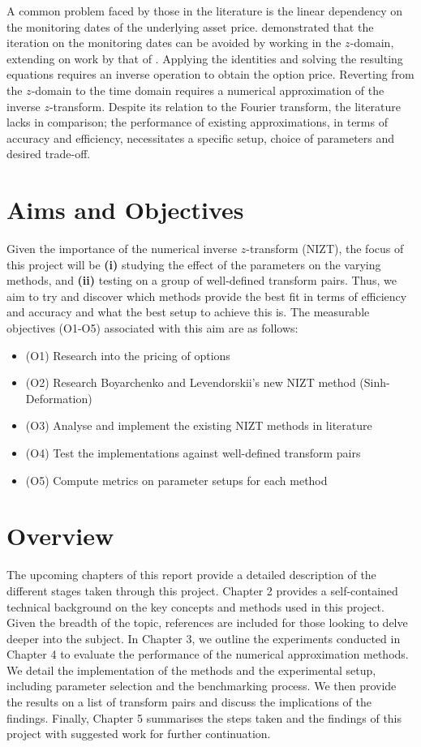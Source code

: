 \documentclass[a4paper]{report}
\begin{document}
A common problem faced by those in the literature is the linear dependency on the monitoring dates of the underlying asset price. \citet{fusai2016spitzer} demonstrated that the iteration on the monitoring dates can be avoided by working in the $z$-domain, extending on work by that of \citet{carr1999option}. Applying the \citet{spitzer1957wiener} identities and solving the resulting equations requires an inverse operation to obtain the option price. Reverting from the $z$-domain to the time domain requires a numerical approximation of the inverse $z$-transform. Despite its relation to the Fourier transform, the literature lacks in comparison; the performance of existing approximations, in terms of accuracy and efficiency, necessitates a specific setup, choice of parameters and desired trade-off.

\section{Aims and Objectives}
Given the importance of the numerical inverse $z$-transform (NIZT), the focus of this project will be \textbf{(i)} studying the effect of the parameters on the varying methods, and \textbf{(ii)} testing on a group of well-defined transform pairs. Thus, we aim to try and discover which methods provide the best fit in terms of efficiency and accuracy and what the best setup to achieve this is. The measurable objectives (O1-O5) associated with this aim are as follows:

\begin{itemize}
	\item (O1) Research into the pricing of options
	\item (O2) Research Boyarchenko and Levendorskii's new NIZT method (Sinh-Deformation)
	\item (O3) Analyse and implement the existing NIZT methods in literature
	\item (O4) Test the implementations against well-defined transform pairs
	\item (O5) Compute metrics on parameter setups for each method
\end{itemize}

\section{Overview}
The upcoming chapters of this report provide a detailed description of the different stages taken through this project. Chapter 2 provides a self-contained technical background on the key concepts and methods used in this project. Given the breadth of the topic, references are included for those looking to delve deeper into the subject. In Chapter 3, we outline the experiments conducted in Chapter 4 to evaluate the performance of the numerical approximation methods. We detail the implementation of the methods and the experimental setup, including parameter selection and the benchmarking process. We then provide the results on a list of transform pairs and discuss the implications of the findings. Finally, Chapter 5 summarises the steps taken and the findings of this project with suggested work for further continuation. 
\end{document}
